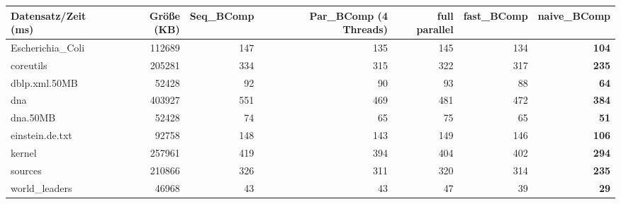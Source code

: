 \documentclass[10pt,a4paper]{standalone}
\begin{document}
	
	
	\begin{tabular}{l|r|r|r|r|r|r}
		Datensatz/Zeit (ms) & Größe (KB) & Seq\_BComp & Par\_BComp (4 Threads) & full parallel & fast\_BComp & naive\_BComp \\ \hline
  Escherichia\_Coli & 112689 & 147 & 135 & 145 & 134 & \textbf{104} \\
          coreutils & 205281 & 334 & 315 & 322 & 317 & \textbf{235} \\
      dblp.xml.50MB &  52428 &  92 &  90 &  93 &  88 &  \textbf{64} \\
                dna & 403927 & 551 & 469 & 481 & 472 & \textbf{384} \\
           dna.50MB &  52428 &  74 &  65 &  75 &  65 &  \textbf{51} \\
    einstein.de.txt &  92758 & 148 & 143 & 149 & 146 & \textbf{106} \\
             kernel & 257961 & 419 & 394 & 404 & 402 & \textbf{294} \\
            sources & 210866 & 326 & 311 & 320 & 314 & \textbf{235} \\
     world\_leaders &  46968 &  43 &  43 &  47 &  39 &  \textbf{29} \\
	\end{tabular}
\end{document}
